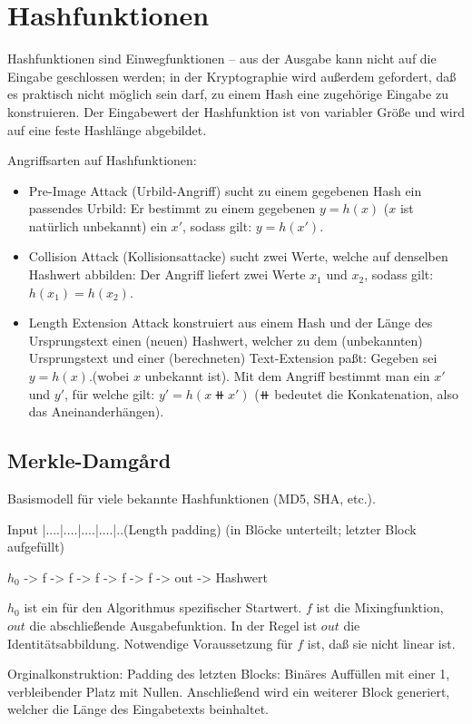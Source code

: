 \chapter{Hashfunktionen}

Hashfunktionen sind Einwegfunktionen -- aus der Ausgabe kann nicht auf die Eingabe geschlossen werden; in der Kryptographie wird außerdem gefordert, daß es praktisch nicht möglich sein darf, zu einem Hash eine zugehörige Eingabe zu konstruieren. Der Eingabewert der Hashfunktion ist von variabler Größe und wird auf eine feste Hashlänge abgebildet.

Angriffsarten auf Hashfunktionen:
\begin{itemize}
\item{Pre-Image Attack (Urbild-Angriff)} sucht zu einem gegebenen Hash ein passendes Urbild: Er bestimmt zu einem gegebenen $y=h(x)$ ($x$ ist natürlich unbekannt) ein $x'$, sodass gilt: $y=h(x')$.
\item{Collision Attack (Kollisionsattacke)} sucht zwei Werte, welche auf denselben Hashwert abbilden: Der Angriff liefert zwei Werte $x_1$ und $x_2$, sodass gilt: $h(x_1)=h(x_2)$.
\item{Length Extension Attack} konstruiert aus einem Hash und der Länge des Ursprungstext einen (neuen) Hashwert, welcher zu dem (unbekannten) Ursprungstext und einer (berechneten) Text-Extension paßt: Gegeben sei $y = h(x)$.(wobei $x$ unbekannt ist). Mit dem Angriff bestimmt man ein $x'$ und $y'$, für welche gilt: $ y' = h(x \doubleplus x')$ ($\doubleplus$ bedeutet die Konkatenation, also das Aneinanderhängen).
\end{itemize}

\section{Merkle-Damgård}

Basismodell für viele bekannte Hashfunktionen (MD5, SHA, etc.).

Input  |....|....|....|....|..(Length padding)  (in Blöcke unterteilt; letzter Block aufgefüllt)

$h_0$ -> f -> f -> f -> f -> f -> out -> Hashwert

$h_0$ ist ein für den Algorithmus spezifischer Startwert. $f$ ist die Mixingfunktion, $out$ die abschließende Ausgabefunktion. In der Regel ist $out$ die Identitätsabbildung. Notwendige Voraussetzung für $f$ ist, daß sie nicht linear ist.

Orginalkonstruktion: Padding des letzten Blocks: Binäres Auffüllen mit einer 1, verbleibender Platz mit Nullen. Anschließend wird ein weiterer Block generiert, welcher die Länge des Eingabetexts beinhaltet.

